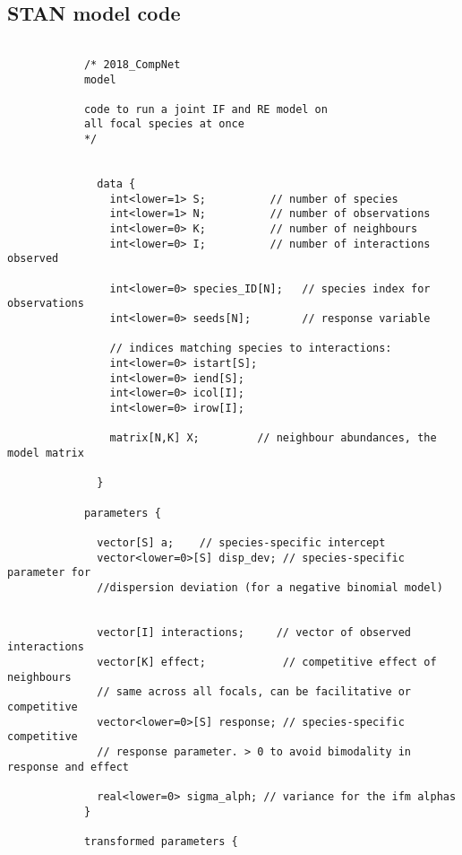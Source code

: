 \documentclass[a4,12pt]{article}
\begin{document}
        \subsection{STAN model code}

            \begin{lstlisting}

            /* 2018_CompNet
            model

            code to run a joint IF and RE model on 
            all focal species at once
            */ 
              
              
              data {
                int<lower=1> S;          // number of species 
                int<lower=1> N;          // number of observations
                int<lower=0> K;          // number of neighbours 
                int<lower=0> I;          // number of interactions observed
                
                int<lower=0> species_ID[N];   // species index for observations
                int<lower=0> seeds[N];        // response variable 
                
                // indices matching species to interactions:
                int<lower=0> istart[S];  
                int<lower=0> iend[S];
                int<lower=0> icol[I];
                int<lower=0> irow[I];
                
                matrix[N,K] X;         // neighbour abundances, the model matrix
              
              } 

            parameters {
              
              vector[S] a;    // species-specific intercept
              vector<lower=0>[S] disp_dev; // species-specific parameter for 
              //dispersion deviation (for a negative binomial model)
              
              
              vector[I] interactions;     // vector of observed interactions
              vector[K] effect;            // competitive effect of neighbours
              // same across all focals, can be facilitative or competitive
              vector<lower=0>[S] response; // species-specific competitive 
              // response parameter. > 0 to avoid bimodality in response and effect  

              real<lower=0> sigma_alph; // variance for the ifm alphas
            } 

            transformed parameters {
              

\end{lstlisting}
\end{document}
